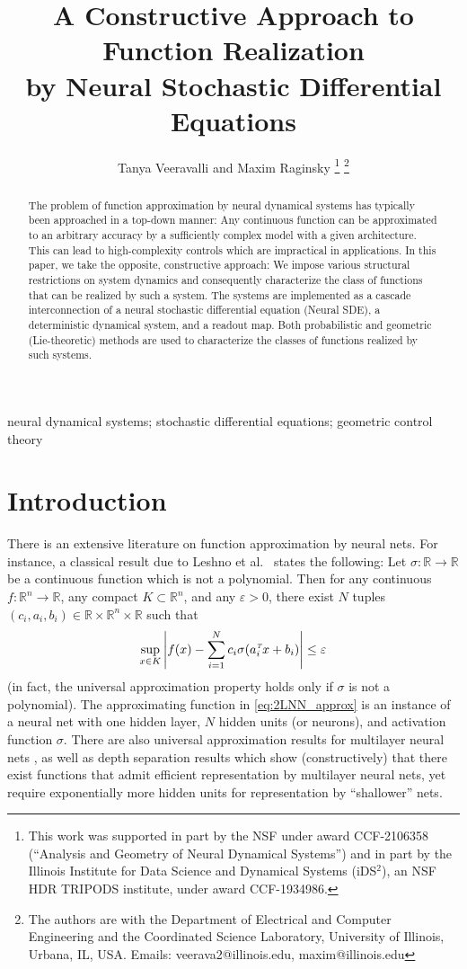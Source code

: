 \documentclass[letterpaper, 10pt, conference]{ieeeconf}
\title{\LARGE{\textbf{A Constructive Approach to Function Realization\\
by Neural Stochastic Differential Equations}}}
\author{Tanya Veeravalli and Maxim Raginsky%
\thanks{This work was supported in part by the NSF under award CCF-2106358 (``Analysis and Geometry of Neural Dynamical Systems'') and in part by the Illinois Institute for Data Science and Dynamical Systems
(iDS${}^2$), an NSF HDR TRIPODS institute, under award CCF-1934986.}%
\thanks{The authors are with the Department of Electrical and Computer Engineering and the Coordinated Science Laboratory, University of Illinois, Urbana, IL, USA. Emails: veerava2@illinois.edu, maxim@illinois.edu}
}
\def\Reals{{\mathbb R}}
\def\trn{{\hbox{\it\tiny T}}} %
\def\eps{\varepsilon}
\begin{document}
\maketitle



\begin{abstract}
The problem of function approximation by neural dynamical systems has typically been approached in a top-down manner: Any continuous function can be approximated to an arbitrary accuracy by a sufficiently complex model with a given architecture. This can lead to high-complexity controls which are impractical in applications. In this paper, we take the opposite, constructive approach: We impose various structural restrictions on system dynamics and consequently characterize the class of functions that can be realized by such a system. The systems are implemented as a cascade interconnection of a neural stochastic differential equation (Neural SDE), a deterministic dynamical system, and a readout map. Both probabilistic and geometric (Lie-theoretic) methods are used to characterize the classes of functions realized by such systems.
\end{abstract}

\begin{keywords} neural dynamical systems; stochastic differential equations; geometric control theory
\end{keywords}


\section{Introduction}

There is an extensive literature on function approximation by neural nets. For instance, a classical result due to Leshno et al.~\cite{Leshno_etal_NN} states the following: Let $\sigma : \Reals \to \Reals$ be a continuous function which is not a polynomial.  Then for any continuous $f : \Reals^n \to \Reals$, any compact $K \subset \Reals^n$, and any $\eps > 0$, there exist $N$ tuples $(c_i,a_i,b_i) \in \Reals \times \Reals^n \times \Reals$ such that
\begin{align}\label{eq:2LNN_approx}
	\sup_{x \in K} \Bigg|f(x) - \sum^N_{i=1} c_i \sigma(a_i^\trn x + b_i)\Bigg| \le \eps
\end{align}
(in fact, the universal approximation property holds only if $\sigma$ is not a polynomial). The approximating function in \eqref{eq:2LNN_approx} is an instance of a neural net with one hidden layer, $N$ hidden units (or neurons), and activation function $\sigma$. There are also universal approximation results for multilayer neural nets \cite{Yarotsky_ReLU_approx}, as well as depth separation results \cite{Telgarsky_depth_sep} which show (constructively) that there exist functions that admit efficient representation by multilayer neural nets, yet require exponentially more hidden units for representation by ``shallower'' nets.
\end{document}
